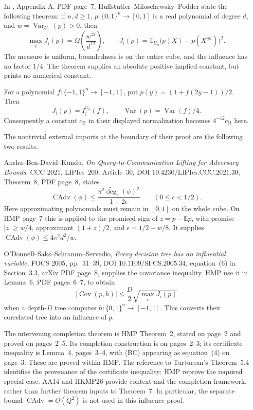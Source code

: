 \begin{remark}
\label{ian:hmp-influence-audit}
In , Appendix A, PDF page~7,
Huffstutler--Miloschewsky--Podder state the following theorem:
if \(n,d\ge1\), \(p:\{0,1\}^n\to[0,1]\) is a real polynomial
of degree \(d\), and \(w=\operatorname{Var}_{U_n}(p)>0\), then
\[
 \max_i J_i(p)=\Omega\!\left(\frac{w^{12}}{d^{12}}\right),
 \qquad
 J_i(p)=\mathbb E_{U_n}\bigl(p(X)-p(X^{\oplus i})\bigr)^2.
\]
The measure is uniform, boundedness is on the entire cube, and the
influence has no factor \(1/4\). The theorem supplies an absolute
positive implied constant, but prints no numerical constant.

For a polynomial \(f:\{-1,1\}^n\to[-1,1]\), put
\(p(y)=(1+f(2y-1))/2\). Then
\[
 J_i(p)=I_i^{U_n}(f),\qquad
 \operatorname{Var}(p)=\operatorname{Var}(f)/4.
\]
Consequently a constant \(c_{\mathrm H}\) in their displayed
normalization becomes \(4^{-12}c_{\mathrm H}\) here.

The nontrivial external imports at the boundary of their proof are
the following two results.

Anshu--Ben-David--Kundu, \emph{On Query-to-Communication Lifting for
Adversary Bounds}, CCC 2021, LIPIcs~200, Article~30,
DOI \(10.4230/\mathrm{LIPIcs.CCC.2021.30}\), Theorem~8,
PDF page~8, states
\[
 \operatorname{CAdv}(\phi)
 \le \frac{\pi^2\widetilde{\deg}_{\epsilon}(\phi)^2}{1-2\epsilon}
 \qquad(0\le\epsilon<1/2).
\]
Here approximating polynomials must remain in \([0,1]\) on the whole
cube. On HMP page~7 this is applied to the promised sign of
\(z=p-\mathbb Ep\), with promise \(|z|\ge w/4\), approximant
\((1+z)/2\), and \(\epsilon=1/2-w/8\). It supplies
\(\operatorname{CAdv}(\phi)\le4\pi^2d^2/w\).

O'Donnell--Saks--Schramm--Servedio, \emph{Every decision tree has an
influential variable}, FOCS 2005, pp.~31--39,
DOI \(10.1109/\mathrm{SFCS.2005.34}\), equation~(6) in
Section~3.3, arXiv PDF page~8, supplies the covariance inequality.
HMP use it in Lemma~6, PDF pages~6--7, to obtain
\[
 |\operatorname{Cov}(p,h)|
 \le \frac D2\sqrt{\max_i J_i(p)}
\]
when a depth-\(D\) tree computes \(h:\{0,1\}^n\to[-1,1]\).
This converts their correlated tree into an influence of \(p\).

The intervening completion theorem is HMP Theorem~2, stated on
page~2 and proved on pages~2--5. Its completion construction is on
pages~2--3; its certificate inequality is Lemma~4, pages~3--4,
with (BC) appearing as equation~(4) on page~3.
These are proved within HMP. The reference to Turturean's
Theorem~5.4 identifies the provenance of the certificate inequality;
HMP reprove the required special case. AA14 and HKMP26 provide
context and the completion framework, rather than further theorem
inputs to Theorem~7. In particular, the separate bound
\(\operatorname{CAdv}=O(Q^2)\) is not used in this influence proof.
\end{remark}

